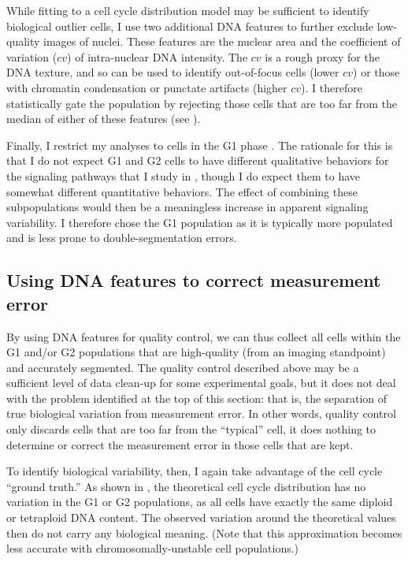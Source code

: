 While fitting to a cell cycle distribution model may
be sufficient to identify biological outlier cells, I use two
additional DNA features to further exclude low-quality
images of nuclei. These features
are the nuclear area and the coefficient of variation ($cv$)
of intra-nuclear DNA intensity.
The $cv$ is a rough proxy for the DNA texture,
and so can be used to identify out-of-focus cells
(lower $cv$) or those with chromatin condensation or
punctate artifacts (higher $cv$). I therefore statistically
gate the population by rejecting those cells that are too
far from the median of either of these features
(see ).


Finally, I restrict my analyses to cells in the G1 phase
.
The rationale for this is that I do not expect G1
and G2 cells to have different qualitative behaviors
for the signaling pathways that I study in ,
though I do expect them to have somewhat different quantitative
behaviors. The effect of combining these subpopulations
would then be a meaningless increase in apparent signaling variability.
I therefore chose the G1 population as it is
typically more populated and is less prone to
double-segmentation errors.


\subsection{Using DNA features to correct measurement error}


By using DNA features for quality control, we can thus collect
all cells within the G1 and/or G2 populations that are high-quality
(from an imaging standpoint) and accurately segmented.
The quality control described above may be a sufficient level of
data clean-up for some experimental goals, but
it does not deal with the problem
identified at the top of this section: 
that is, the separation of true biological variation from
measurement error. In other words, quality control only discards
cells that are too far from the ``typical'' cell, it does nothing
to determine or correct the measurement error in those cells that are kept.


To identify biological variability, then,
I again take advantage of the cell cycle ``ground truth.''
As shown in , the theoretical
cell cycle distribution has no variation in the G1 or G2
populations, as all cells have exactly the same diploid
or tetraploid DNA content. The observed variation
around the theoretical values then do not carry any biological
meaning. (Note that this approximation becomes less accurate
with chromosomally-unstable cell populations.)


